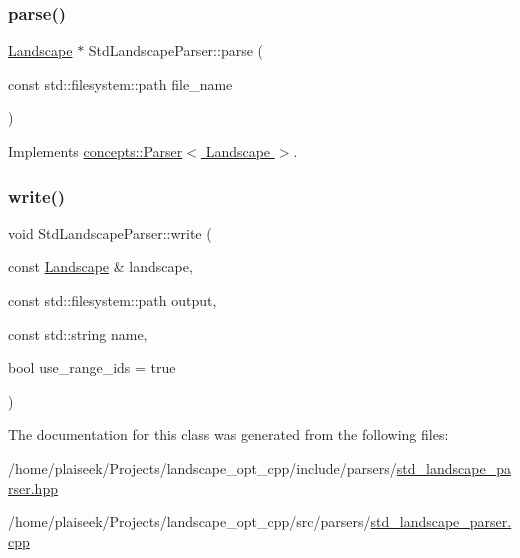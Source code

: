 \subsubsection{\texorpdfstring{parse()}{parse()}}
{\footnotesize\ttfamily \hyperlink{class_landscape}{Landscape} $\ast$ Std\+Landscape\+Parser\+::parse (\begin{DoxyParamCaption}\item[{const std\+::filesystem\+::path}]{file\+\_\+name }\end{DoxyParamCaption})\hspace{0.3cm}{\ttfamily [virtual]}}



Implements \hyperlink{classconcepts_1_1_parser_ac5e6fbf08f6d462695c946647aafb2ce}{concepts\+::\+Parser$<$ Landscape $>$}.

\mbox{\label{class_std_landscape_parser_aa899b09850676bac3abdc04d25882e86}} 
\subsubsection{\texorpdfstring{write()}{write()}}
{\footnotesize\ttfamily void Std\+Landscape\+Parser\+::write (\begin{DoxyParamCaption}\item[{const \hyperlink{class_landscape}{Landscape} \&}]{landscape,  }\item[{const std\+::filesystem\+::path}]{output,  }\item[{const std\+::string}]{name,  }\item[{bool}]{use\+\_\+range\+\_\+ids = {\ttfamily true} }\end{DoxyParamCaption})}



The documentation for this class was generated from the following files\+:\begin{DoxyCompactItemize}
\item 
/home/plaiseek/\+Projects/landscape\+\_\+opt\+\_\+cpp/include/parsers/\hyperlink{std__landscape__parser_8hpp}{std\+\_\+landscape\+\_\+parser.\+hpp}\item 
/home/plaiseek/\+Projects/landscape\+\_\+opt\+\_\+cpp/src/parsers/\hyperlink{std__landscape__parser_8cpp}{std\+\_\+landscape\+\_\+parser.\+cpp}\end{DoxyCompactItemize}
